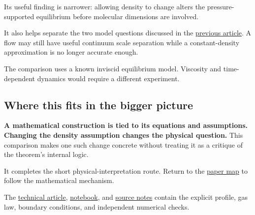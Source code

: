 \documentclass[
  english,
  11pt,
]{article}
\begin{document}
Its useful finding is narrower: allowing density to change alters the
pressure-supported equilibrium before molecular dimensions are involved.

It also helps separate the two model questions discussed in the
\href{../d9_regime_map/article.html}{previous article}. A flow may still
have useful continuum scale separation while a constant-density
approximation is no longer accurate enough.

The comparison uses a known inviscid equilibrium model. Viscosity and
time-dependent dynamics would require a different experiment.

\subsection{Where this fits in the bigger
picture}\label{where-this-fits-in-the-bigger-picture}

\textbf{A mathematical construction is tied to its equations and
assumptions. Changing the density assumption changes the physical
question.} This comparison makes one such change concrete without
treating it as a critique of the theorem's internal logic.

It completes the short physical-interpretation route. Return to the
\href{../paper-map/article.html}{paper map} to follow the mathematical
mechanism.

The \href{technical-article.html}{technical article},
\href{../../code/d10_compressible_vortex/study.ipynb}{notebook}, and
\href{source-notes.md}{source notes} contain the explicit profile, gas
law, boundary conditions, and independent numerical checks.
\end{document}
